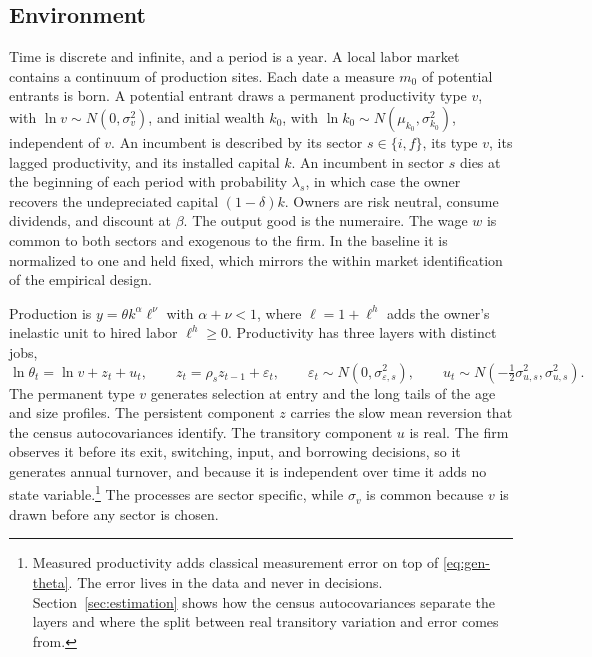 \documentclass[12pt]{article}
\begin{document}
\subsection{Environment}

Time is discrete and infinite, and a period is a year. A local labor market contains a continuum of production sites. Each date a measure $m_{0}$ of potential entrants is born. A potential entrant draws a permanent productivity type $v$, with $\ln v\sim N(0,\sigma_{v}^{2})$, and initial wealth $k_{0}$, with $\ln k_{0}\sim N(\mu_{k_{0}},\sigma_{k_{0}}^{2})$, independent of $v$. An incumbent is described by its sector $s\in\{i,f\}$, its type $v$, its lagged productivity, and its installed capital $k$. An incumbent in sector $s$ dies at the beginning of each period with probability $\lambda_{s}$, in which case the owner recovers the undepreciated capital $(1-\delta)k$. Owners are risk neutral, consume dividends, and discount at $\beta$. The output good is the numeraire. The wage $w$ is common to both sectors and exogenous to the firm. In the baseline it is normalized to one and held fixed, which mirrors the within market identification of the empirical design.

Production is $y=\theta k^{\alpha}\ell^{\nu}$ with $\alpha+\nu<1$, where $\ell=1+\ell^{h}$ adds the owner's inelastic unit to hired labor $\ell^{h}\geq 0$. Productivity has three layers with distinct jobs,
\begin{equation}
  \ln\theta_{t}=\ln v+z_{t}+u_{t},
  \qquad
  z_{t}=\rho_{s}z_{t-1}+\varepsilon_{t},
  \qquad
  \varepsilon_{t}\sim N(0,\sigma_{\varepsilon,s}^{2}),
  \qquad
  u_{t}\sim N(-\tfrac{1}{2}\sigma_{u,s}^{2},\sigma_{u,s}^{2}).
  \label{eq:gen-theta}
\end{equation}
The permanent type $v$ generates selection at entry and the long tails of the age and size profiles. The persistent component $z$ carries the slow mean reversion that the census autocovariances identify. The transitory component $u$ is real. The firm observes it before its exit, switching, input, and borrowing decisions, so it generates annual turnover, and because it is independent over time it adds no state variable.\footnote{Measured productivity adds classical measurement error on top of \eqref{eq:gen-theta}. The error lives in the data and never in decisions. Section~\ref{sec:estimation} shows how the census autocovariances separate the layers and where the split between real transitory variation and error comes from.} The processes are sector specific, while $\sigma_{v}$ is common because $v$ is drawn before any sector is chosen.
\end{document}
